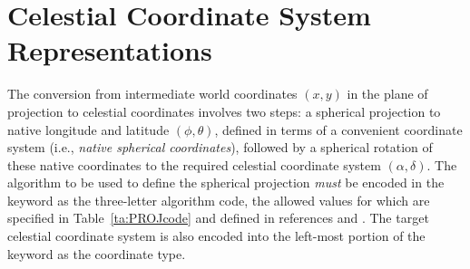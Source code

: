 \documentclass[11pt,makeidx]{book}     %
\begin{document}
\section{Celestial Coordinate System Representations}\label{sect:Celestkw}

The conversion from intermediate world coordinates $(x,y)$ in the plane of
projection to celestial coordinates involves two steps: a spherical projection to
native longitude and latitude $(\phi, \theta)$, defined in terms of a convenient
coordinate system (i.e., \textit{native spherical coordinates}), followed by a
spherical rotation of these native coordinates to the required celestial
coordinate system $(\alpha, \delta)$. The algorithm to be used to define the
spherical projection {\em must} be encoded in the  keyword as
the three-letter algorithm code, the allowed values for which are specified in
Table~\ref{ta:PROJcode} and defined in references \cite{calabretta02} and 
\cite{calabretta07}.
The target celestial coordinate system is also encoded into the
left-most portion of the  keyword as the coordinate type.
\end{document}
